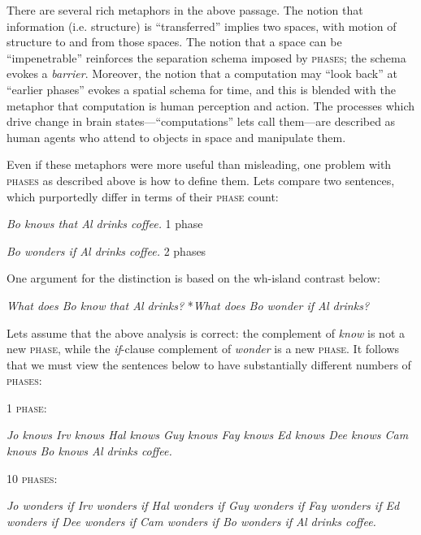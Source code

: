   There are several rich metaphors in the above passage. The notion that information (i.e. structure) is “transferred” implies two spaces, with motion of structure to and from those spaces. The notion that a space can be “impenetrable” reinforces the separation schema imposed by \textsc{phases}; the schema evokes a \textit{barrier}. Moreover, the notion that a computation may “look back” at “earlier phases” evokes a spatial schema for time, and this is blended with the metaphor that computation is human perception and action. The processes which drive change in brain states—“computations” lets call them—are described as human agents who attend to objects in space and manipulate them.

  Even if these metaphors were more useful than misleading, one problem with \textsc{phases} as described above is how to define them. Lets compare two sentences, which purportedly differ in terms of their \textsc{phase} count:

\begin{exe}
 \textit{Bo knows that Al drinks coffee.}  1 phase

 \textit{Bo wonders if Al drinks coffee.}  2 phases
\end{exe}

One argument for the distinction is based on the wh-island contrast below:

\begin{exe}
 \textit{What does Bo know that Al drinks?}
 *\textit{What does Bo wonder if Al drinks?}
\end{exe}

  Lets assume that the above analysis is correct: the complement of \textit{know} is not a new \textsc{phase}, while the \textit{if}{}-clause complement of \textit{wonder} is a new \textsc{phase}. It follows that we must view the sentences below to have substantially different numbers of \textsc{phases}:

1 \textsc{phase}:

\textit{Jo knows Irv knows Hal knows Guy knows Fay knows Ed knows Dee knows Cam knows Bo knows Al drinks coffee.}

10 \textsc{phases}:

\textit{Jo wonders if Irv wonders if Hal wonders if Guy wonders if Fay wonders if Ed wonders if Dee wonders if Cam wonders if Bo wonders if Al drinks coffee.}

